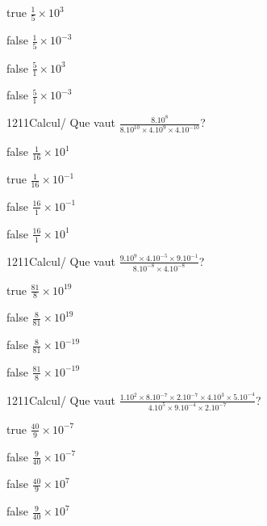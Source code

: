             \begin{reponses}
                \item[true] $\frac{1}{5}\times 10^{3}$
                \item[false] $\frac{1}{5}\times 10^{-3}$
                \item[false] $\frac{5}{1}\times 10^{3}$
                \item[false] $\frac{5}{1}\times 10^{-3}$
            \end{reponses}
            \begin{question}{1211}{Calcul}{}{/}
                Que vaut $\frac{8.10^{8}}{8.10^{10}\times 4.10^{9}\times 4.10^{-10}}$?
            \end{question}
            \begin{reponses}
                \item[false] $\frac{1}{16}\times 10^{1}$
                \item[true] $\frac{1}{16}\times 10^{-1}$
                \item[false] $\frac{16}{1}\times 10^{-1}$
                \item[false] $\frac{16}{1}\times 10^{1}$
            \end{reponses}
            \begin{question}{1211}{Calcul}{}{/}
                Que vaut $\frac{9.10^{9}\times 4.10^{-5}\times 9.10^{-1}}{8.10^{-8}\times 4.10^{-8}}$?
            \end{question}
            \begin{reponses}
                \item[true] $\frac{81}{8}\times 10^{19}$
                \item[false] $\frac{8}{81}\times 10^{19}$
                \item[false] $\frac{8}{81}\times 10^{-19}$
                \item[false] $\frac{81}{8}\times 10^{-19}$
            \end{reponses}
            \begin{question}{1211}{Calcul}{}{/}
                Que vaut $\frac{1.10^{2}\times 8.10^{-7}\times 2.10^{-7}\times 4.10^{3}\times 5.10^{-4}}{4.10^{5}\times 9.10^{-4}\times 2.10^{-7}}$?
            \end{question}
            \begin{reponses}
                \item[true] $\frac{40}{9}\times 10^{-7}$
                \item[false] $\frac{9}{40}\times 10^{-7}$
                \item[false] $\frac{40}{9}\times 10^{7}$
                \item[false] $\frac{9}{40}\times 10^{7}$
            \end{reponses}
